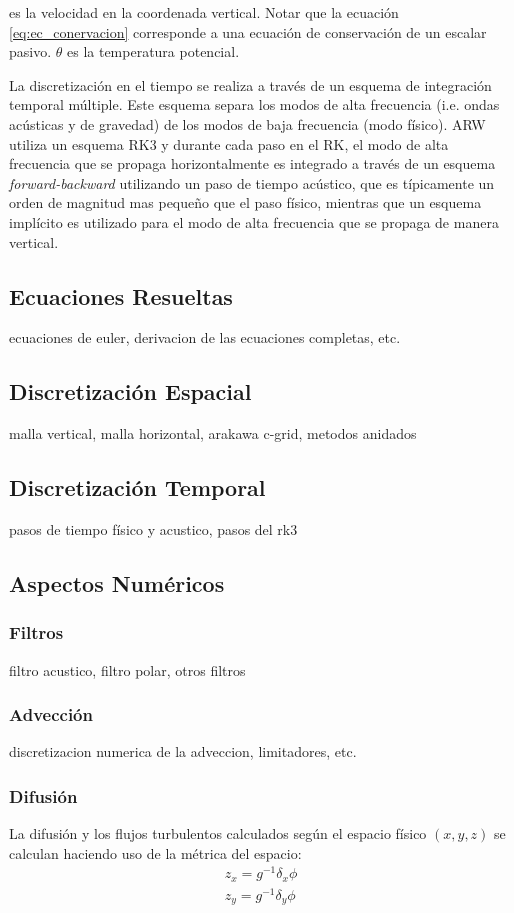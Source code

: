 es la velocidad en la coordenada vertical. Notar que la ecuación \ref{eq:ec_conervacion} corresponde a una ecuación de conservación de un escalar pasivo. $\theta$ es la temperatura potencial.

La discretización en el tiempo se realiza a través de un esquema de integración temporal múltiple. Este esquema separa los modos de alta frecuencia (i.e. ondas acústicas y de gravedad) de los modos de baja frecuencia (modo físico). ARW utiliza un esquema RK3 y durante cada paso en el RK, el modo de alta frecuencia que se propaga horizontalmente es integrado a través de un esquema \emph{forward-backward} utilizando un paso de tiempo acústico, que es típicamente un orden de magnitud mas pequeño que el paso físico, mientras que un esquema implícito es utilizado para el modo de alta frecuencia que se propaga de manera vertical.
\subsection{Ecuaciones Resueltas}
ecuaciones de euler, derivacion de las ecuaciones completas, etc.
\subsection{Discretización Espacial}
malla vertical, malla horizontal, arakawa c-grid, metodos anidados
\subsection{Discretización Temporal}
pasos de tiempo físico y acustico, pasos del rk3
\subsection{Aspectos Numéricos}
\subsubsection{Filtros}
filtro acustico, filtro polar, otros filtros
\subsubsection{Advección}
discretizacion numerica de la adveccion, limitadores, etc.
\subsubsection{Difusión}
La difusión y los flujos turbulentos calculados según el espacio físico $(x,y,z)$ se calculan haciendo uso de la métrica del espacio:
\begin{eqnarray}
z_x=g^{-1}\delta_x\phi \\
z_y=g^{-1}\delta_y\phi
\end{eqnarray}


